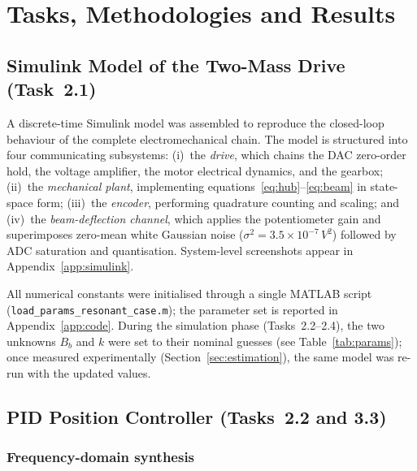 \documentclass[11pt]{article}
\begin{document}
\section{Tasks, Methodologies and Results}

\subsection{Simulink Model of the Two-Mass Drive (Task~2.1)}

A discrete-time Simulink model was assembled to reproduce the closed-loop behaviour of the
complete electromechanical chain.  The model is structured into four communicating
subsystems: (i)~the \emph{drive}, which chains the DAC zero-order hold, the voltage
amplifier, the motor electrical dynamics, and the gearbox; (ii)~the \emph{mechanical
plant}, implementing equations~\eqref{eq:hub}--\eqref{eq:beam} in state-space form;
(iii)~the \emph{encoder}, performing quadrature counting and scaling; and (iv)~the
\emph{beam-deflection channel}, which applies the potentiometer gain and superimposes
zero-mean white Gaussian noise ($\sigma^2 = 3.5\times10^{-7}\,\si{V^2}$) followed by ADC
saturation and quantisation.  System-level screenshots appear in Appendix~\ref{app:simulink}.

All numerical constants were initialised through a single MATLAB script
(\texttt{load\_params\_resonant\_case.m}); the parameter set is reported in
Appendix~\ref{app:code}.  During the simulation phase (Tasks~2.2--2.4), the two unknowns
$B_b$ and $k$ were set to their nominal guesses (see Table~\ref{tab:params}); once
measured experimentally (Section~\ref{sec:estimation}), the same model was re-run with the
updated values.

\subsection{PID Position Controller (Tasks~2.2 and 3.3)}

\subsubsection*{Frequency-domain synthesis}
\end{document}
